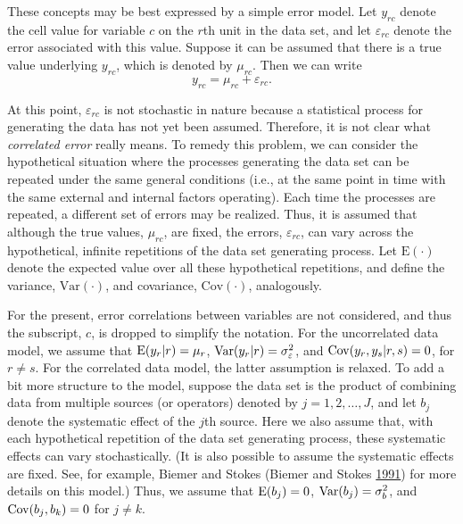 \documentclass[]{krantz}
\begin{document}
These concepts may be best expressed by a simple error model. Let
\(y_{rc}\) denote the cell value for variable \(c\) on the \(r\)th unit
in the data set, and let \(\varepsilon_{rc}\) denote the error
associated with this value. Suppose it can be assumed that there is a
true value underlying \(y_{rc}\), which is denoted by \(\mu_{rc}\). Then
we can write \[\label{eq:10-1.1}
y_{rc} = \mu_{rc} + \varepsilon_{rc}.\]

At this point, \(\varepsilon_{rc}\) is not stochastic in nature because
a statistical process for generating the data has not yet been assumed.
Therefore, it is not clear what \emph{correlated error} really means. To
remedy this problem, we can consider the hypothetical situation where
the processes generating the data set can be repeated under the same
general conditions (i.e., at the same point in time with the same
external and internal factors operating). Each time the processes are
repeated, a different set of errors may be realized. Thus, it is assumed
that although the true values, \(\mu_{rc}\), are fixed, the errors,
\(\varepsilon_{rc}\), can vary across the hypothetical, infinite
repetitions of the data set generating process. Let \(\mbox{E}(\cdot)\)
denote the expected value over all these hypothetical repetitions, and
define the variance, \(\mathrm{Var}(\cdot)\), and covariance,
\(\mathrm{Cov}(\cdot)\), analogously.

For the present, error correlations between variables are not
considered, and thus the subscript, \(c\), is dropped to simplify the
notation. For the uncorrelated data model, we assume that
\({\rm E}(y_r \vert r) = \mu_r\),
\({\rm Var}(y_r \vert r) = \sigma_\varepsilon^2\), and
\({\rm Cov}(y_r ,y_s \vert r,s) = 0\), for \(r \ne s\). For the
correlated data model, the latter assumption is relaxed. To add a bit
more structure to the model, suppose the data set is the product of
combining data from multiple sources (or operators) denoted by
\(j = 1, 2, \ldots, J\), and let \(b_j\) denote the systematic effect of
the \(j\)th source. Here we also assume that, with each hypothetical
repetition of the data set generating process, these systematic effects
can vary stochastically. (It is also possible to assume the systematic
effects are fixed. See, for example, Biemer and Stokes (Biemer and
Stokes \protect\hyperlink{ref-BiemerStokes1991}{1991}) for more details
on this model.) Thus, we assume that \({\rm E}(b_j ) = 0\),
\({\rm Var}(b_j ) = \sigma_b^2\), and \({\rm Cov}(b_j ,b_k ) = 0\) for
\(j \ne k\).
\end{document}
